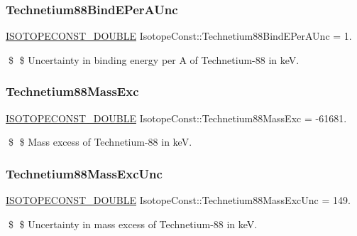 \subsubsection{\texorpdfstring{Technetium88\+Bind\+E\+Per\+A\+Unc}{Technetium88BindEPerAUnc}}
{\footnotesize\ttfamily \mbox{\hyperlink{group___isotope_const-_macros_ga8f45a7272ce02c0b4c65c44636ed719a}{I\+S\+O\+T\+O\+P\+E\+C\+O\+N\+S\+T\+\_\+\+D\+O\+U\+B\+LE}} Isotope\+Const\+::\+Technetium88\+Bind\+E\+Per\+A\+Unc = 1.}

\$ \$ Uncertainty in binding energy per A of Technetium-\/88 in keV. \mbox{\label{group___isotope_const-_technetium-_tc88_ga3181d47ac3bfe57932262233f5f0ad3d}} 
\subsubsection{\texorpdfstring{Technetium88\+Mass\+Exc}{Technetium88MassExc}}
{\footnotesize\ttfamily \mbox{\hyperlink{group___isotope_const-_macros_ga8f45a7272ce02c0b4c65c44636ed719a}{I\+S\+O\+T\+O\+P\+E\+C\+O\+N\+S\+T\+\_\+\+D\+O\+U\+B\+LE}} Isotope\+Const\+::\+Technetium88\+Mass\+Exc = -\/61681.}

\$ \$ Mass excess of Technetium-\/88 in keV. \mbox{\label{group___isotope_const-_technetium-_tc88_ga4f8799d7c91aa7e00f81dbb7ddf457d1}} 
\subsubsection{\texorpdfstring{Technetium88\+Mass\+Exc\+Unc}{Technetium88MassExcUnc}}
{\footnotesize\ttfamily \mbox{\hyperlink{group___isotope_const-_macros_ga8f45a7272ce02c0b4c65c44636ed719a}{I\+S\+O\+T\+O\+P\+E\+C\+O\+N\+S\+T\+\_\+\+D\+O\+U\+B\+LE}} Isotope\+Const\+::\+Technetium88\+Mass\+Exc\+Unc = 149.}

\$ \$ Uncertainty in mass excess of Technetium-\/88 in keV. \mbox{\label{group___isotope_const-_technetium-_tc88_gac2e1a11afc7b1c0c22286889155153a1}} 
